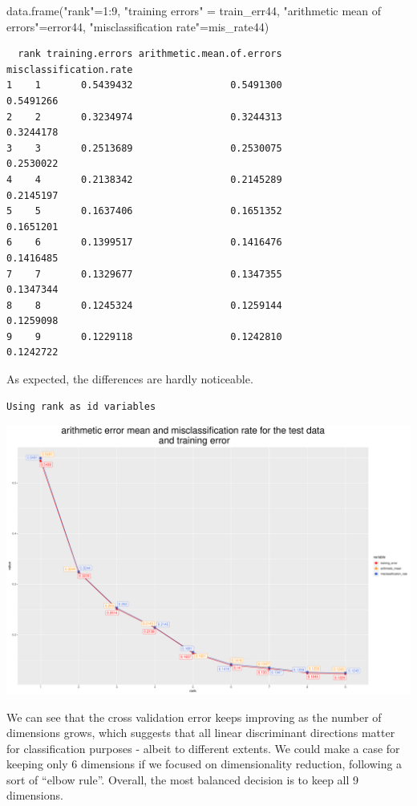 \documentclass[
  letterpaper,
  DIV=11,
  numbers=noendperiod]{scrartcl}
\newenvironment{Shaded}{\begin{snugshade}}{\end{snugshade}}
\newcommand{\DecValTok}[1]{\textcolor[rgb]{0.68,0.00,0.00}{#1}}
\newcommand{\FunctionTok}[1]{\textcolor[rgb]{0.28,0.35,0.67}{#1}}
\newcommand{\NormalTok}[1]{\textcolor[rgb]{0.00,0.23,0.31}{#1}}
\newcommand{\OtherTok}[1]{\textcolor[rgb]{0.00,0.23,0.31}{#1}}
\newcommand{\SpecialCharTok}[1]{\textcolor[rgb]{0.37,0.37,0.37}{#1}}
\newcommand{\StringTok}[1]{\textcolor[rgb]{0.13,0.47,0.30}{#1}}
\begin{document}
\begin{Shaded}
\begin{Highlighting}[]
\FunctionTok{data.frame}\NormalTok{(}\StringTok{"rank"}\OtherTok{=}\DecValTok{1}\SpecialCharTok{:}\DecValTok{9}\NormalTok{, }\StringTok{"training errors"} \OtherTok{=}\NormalTok{ train\_err44, }
       \StringTok{"arithmetic mean of errors"}\OtherTok{=}\NormalTok{error44,}
\StringTok{"misclassification rate"}\OtherTok{=}\NormalTok{mis\_rate44)}
\end{Highlighting}
\end{Shaded}

\begin{verbatim}
  rank training.errors arithmetic.mean.of.errors misclassification.rate
1    1       0.5439432                 0.5491300              0.5491266
2    2       0.3234974                 0.3244313              0.3244178
3    3       0.2513689                 0.2530075              0.2530022
4    4       0.2138342                 0.2145289              0.2145197
5    5       0.1637406                 0.1651352              0.1651201
6    6       0.1399517                 0.1416476              0.1416485
7    7       0.1329677                 0.1347355              0.1347344
8    8       0.1245324                 0.1259144              0.1259098
9    9       0.1229118                 0.1242810              0.1242722
\end{verbatim}

As expected, the differences are hardly noticeable.

\begin{verbatim}
Using rank as id variables
\end{verbatim}

\includegraphics{ProblemSet2_files/figure-pdf/unnamed-chunk-77-1.pdf}

We can see that the cross validation error keeps improving as the number
of dimensions grows, which suggests that all linear discriminant
directions matter for classification purposes - albeit to different
extents. We could make a case for keeping only 6 dimensions if we
focused on dimensionality reduction, following a sort of ``elbow rule''.
Overall, the most balanced decision is to keep all 9 dimensions.
\end{document}
